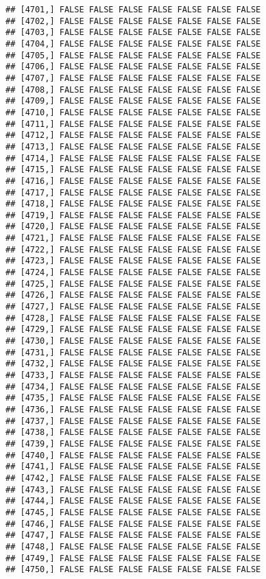 \documentclass[
]{article}
\begin{document}
\begin{verbatim}
## [4701,] FALSE FALSE FALSE FALSE FALSE FALSE FALSE
## [4702,] FALSE FALSE FALSE FALSE FALSE FALSE FALSE
## [4703,] FALSE FALSE FALSE FALSE FALSE FALSE FALSE
## [4704,] FALSE FALSE FALSE FALSE FALSE FALSE FALSE
## [4705,] FALSE FALSE FALSE FALSE FALSE FALSE FALSE
## [4706,] FALSE FALSE FALSE FALSE FALSE FALSE FALSE
## [4707,] FALSE FALSE FALSE FALSE FALSE FALSE FALSE
## [4708,] FALSE FALSE FALSE FALSE FALSE FALSE FALSE
## [4709,] FALSE FALSE FALSE FALSE FALSE FALSE FALSE
## [4710,] FALSE FALSE FALSE FALSE FALSE FALSE FALSE
## [4711,] FALSE FALSE FALSE FALSE FALSE FALSE FALSE
## [4712,] FALSE FALSE FALSE FALSE FALSE FALSE FALSE
## [4713,] FALSE FALSE FALSE FALSE FALSE FALSE FALSE
## [4714,] FALSE FALSE FALSE FALSE FALSE FALSE FALSE
## [4715,] FALSE FALSE FALSE FALSE FALSE FALSE FALSE
## [4716,] FALSE FALSE FALSE FALSE FALSE FALSE FALSE
## [4717,] FALSE FALSE FALSE FALSE FALSE FALSE FALSE
## [4718,] FALSE FALSE FALSE FALSE FALSE FALSE FALSE
## [4719,] FALSE FALSE FALSE FALSE FALSE FALSE FALSE
## [4720,] FALSE FALSE FALSE FALSE FALSE FALSE FALSE
## [4721,] FALSE FALSE FALSE FALSE FALSE FALSE FALSE
## [4722,] FALSE FALSE FALSE FALSE FALSE FALSE FALSE
## [4723,] FALSE FALSE FALSE FALSE FALSE FALSE FALSE
## [4724,] FALSE FALSE FALSE FALSE FALSE FALSE FALSE
## [4725,] FALSE FALSE FALSE FALSE FALSE FALSE FALSE
## [4726,] FALSE FALSE FALSE FALSE FALSE FALSE FALSE
## [4727,] FALSE FALSE FALSE FALSE FALSE FALSE FALSE
## [4728,] FALSE FALSE FALSE FALSE FALSE FALSE FALSE
## [4729,] FALSE FALSE FALSE FALSE FALSE FALSE FALSE
## [4730,] FALSE FALSE FALSE FALSE FALSE FALSE FALSE
## [4731,] FALSE FALSE FALSE FALSE FALSE FALSE FALSE
## [4732,] FALSE FALSE FALSE FALSE FALSE FALSE FALSE
## [4733,] FALSE FALSE FALSE FALSE FALSE FALSE FALSE
## [4734,] FALSE FALSE FALSE FALSE FALSE FALSE FALSE
## [4735,] FALSE FALSE FALSE FALSE FALSE FALSE FALSE
## [4736,] FALSE FALSE FALSE FALSE FALSE FALSE FALSE
## [4737,] FALSE FALSE FALSE FALSE FALSE FALSE FALSE
## [4738,] FALSE FALSE FALSE FALSE FALSE FALSE FALSE
## [4739,] FALSE FALSE FALSE FALSE FALSE FALSE FALSE
## [4740,] FALSE FALSE FALSE FALSE FALSE FALSE FALSE
## [4741,] FALSE FALSE FALSE FALSE FALSE FALSE FALSE
## [4742,] FALSE FALSE FALSE FALSE FALSE FALSE FALSE
## [4743,] FALSE FALSE FALSE FALSE FALSE FALSE FALSE
## [4744,] FALSE FALSE FALSE FALSE FALSE FALSE FALSE
## [4745,] FALSE FALSE FALSE FALSE FALSE FALSE FALSE
## [4746,] FALSE FALSE FALSE FALSE FALSE FALSE FALSE
## [4747,] FALSE FALSE FALSE FALSE FALSE FALSE FALSE
## [4748,] FALSE FALSE FALSE FALSE FALSE FALSE FALSE
## [4749,] FALSE FALSE FALSE FALSE FALSE FALSE FALSE
## [4750,] FALSE FALSE FALSE FALSE FALSE FALSE FALSE

\end{verbatim}
\end{document}
